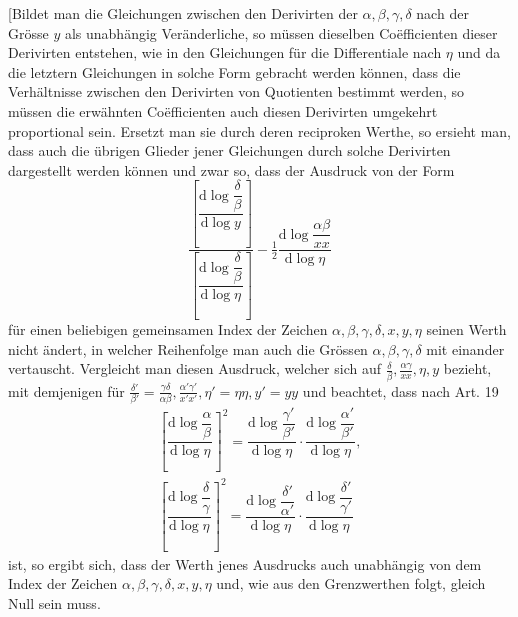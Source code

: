
[Bildet man die Gleichungen zwischen den Derivirten der $\alpha,\allowbreak \beta,\allowbreak \gamma,\allowbreak \delta$
nach der Grösse $y$ als unabhängig Veränderliche, so müssen dieselben Coëfficienten dieser Derivirten entstehen,
wie in den Gleichungen für die Differentiale nach $\eta$ und da die letztern Gleichungen in solche Form gebracht werden können,
dass die Verhältnisse zwischen den Derivirten von Quotienten bestimmt werden,
so müssen die erwähnten Coëfficienten auch diesen Derivirten umgekehrt proportional sein.
Ersetzt man sie durch deren reciproken Werthe, so ersieht man, dass auch die übrigen Glieder jener Gleichungen
durch solche Derivirten dargestellt werden können und zwar so, dass der Ausdruck von der Form
\[
\dfrac{\left[\dfrac{\mathrm{d}\log\dfrac{\delta}{\beta}}{\mathrm{d}\log y}\right]}
{\left[\dfrac{\mathrm{d}\log\dfrac{\delta}{\beta}}{\mathrm{d}\log\eta}\right]}
-\tfrac12\dfrac{\mathrm{d}\log\dfrac{\alpha\beta}{xx}}{\mathrm{d}\log\eta}
\]
für einen beliebigen gemeinsamen Index der Zeichen $\alpha,\allowbreak \beta,\allowbreak \gamma,\allowbreak \delta,\allowbreak x,\allowbreak y,\allowbreak \eta$
seinen Werth nicht ändert, in welcher Reihenfolge man auch die Grössen $\alpha,\allowbreak \beta,\allowbreak \gamma,\allowbreak \delta$ mit einander vertauscht.
Vergleicht man diesen Ausdruck, welcher sich auf $\frac{\delta}{\beta},\allowbreak \frac{\alpha\gamma}{xx},\allowbreak \eta,\allowbreak y$ bezieht,
mit demjenigen für $\frac{\delta'}{\beta'}=\frac{\gamma\delta}{\alpha\beta},\allowbreak \frac{\alpha'\gamma'}{x'x'},\allowbreak \eta'=\eta\eta,\allowbreak y'=yy$
und beachtet, dass nach Art. 19
\[
\begin{gathered}\left[\dfrac{\mathrm{d}\log\dfrac{\alpha}{\beta}}{\mathrm{d}\log\eta}\right]^2
=\dfrac{\mathrm{d}\log\dfrac{\gamma'}{\beta'}}{\mathrm{d}\log\eta}\cdot
\dfrac{\mathrm{d}\log\dfrac{\alpha'}{\beta'}}{\mathrm{d}\log\eta},\\[9pt]
\left[\dfrac{\mathrm{d}\log\dfrac{\delta}{\gamma}}{\mathrm{d}\log\eta}\right]^2
=\dfrac{\mathrm{d}\log\dfrac{\delta'}{\alpha'}}{\mathrm{d}\log\eta}\cdot
\dfrac{\mathrm{d}\log\dfrac{\delta'}{\gamma'}}{\mathrm{d}\log\eta}\end{gathered}
\]
ist, so ergibt sich, dass der Werth jenes Ausdrucks auch unabhängig von dem Index der Zeichen
$\alpha,\allowbreak \beta,\allowbreak \gamma,\allowbreak \delta,\allowbreak x,\allowbreak y,\allowbreak \eta$ und, wie aus den Grenzwerthen folgt, gleich Null sein muss.
